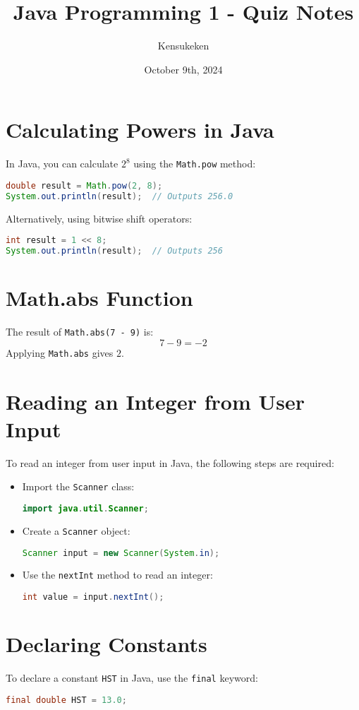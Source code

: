 \documentclass{article}
\title{Java Programming 1 - Quiz Notes}
\author{Kensukeken}
\date{October 9th, 2024}
\begin{document}
\maketitle
\tableofcontents
\newpage


\section{Calculating Powers in Java}
In Java, you can calculate $2^8$ using the \texttt{Math.pow} method:
\begin{lstlisting}[language=Java]
double result = Math.pow(2, 8);
System.out.println(result);  // Outputs 256.0
\end{lstlisting}
Alternatively, using bitwise shift operators:
\begin{lstlisting}[language=Java]
int result = 1 << 8;
System.out.println(result);  // Outputs 256
\end{lstlisting}

\section{Math.abs Function}
The result of \texttt{Math.abs(7 - 9)} is:
\[
7 - 9 = -2
\]
Applying \texttt{Math.abs} gives $2$.

\section{Reading an Integer from User Input}
To read an integer from user input in Java, the following steps are required:
\begin{itemize}
    \item Import the \texttt{Scanner} class:
    \begin{lstlisting}[language=Java]
    import java.util.Scanner;
    \end{lstlisting}
    \item Create a \texttt{Scanner} object:
    \begin{lstlisting}[language=Java]
    Scanner input = new Scanner(System.in);
    \end{lstlisting}
    \item Use the \texttt{nextInt} method to read an integer:
    \begin{lstlisting}[language=Java]
    int value = input.nextInt();
    \end{lstlisting}
\end{itemize}

\section{Declaring Constants}
To declare a constant \texttt{HST} in Java, use the \texttt{final} keyword:
\begin{lstlisting}[language=Java]
final double HST = 13.0;
\end{lstlisting}
\end{document}
